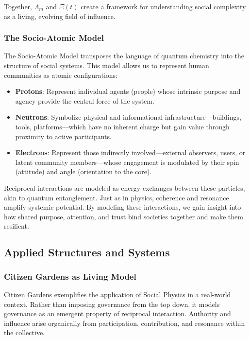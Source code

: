 \documentclass{article}
\theoremstyle{plain}
\theoremstyle{claimstyle}
\begin{document}
Together, $\Lambda_m$ and $\Xi(t)$ create a framework for understanding social complexity as a living, evolving field of influence.

\subsubsection{The Socio-Atomic Model}

The Socio-Atomic Model transposes the language of quantum chemistry into the structure of social systems. This model allows us to represent human communities as atomic configurations:

\begin{itemize}
    \item \textbf{Protons}: Represent individual agents (people) whose intrinsic purpose and agency provide the central force of the system.
    \item \textbf{Neutrons}: Symbolize physical and informational infrastructure—buildings, tools, platforms—which have no inherent charge but gain value through proximity to active participants.
    \item \textbf{Electrons}: Represent those indirectly involved—external observers, users, or latent community members—whose engagement is modulated by their spin (attitude) and angle (orientation to the core).
\end{itemize}

Reciprocal interactions are modeled as energy exchanges between these particles, akin to quantum entanglement. Just as in physics, coherence and resonance amplify systemic potential. By modeling these interactions, we gain insight into how shared purpose, attention, and trust bind societies together and make them resilient.

\subsection{Applied Structures and Systems}

\subsubsection{Citizen Gardens as Living Model}

Citizen Gardens exemplifies the application of Social Physics in a real-world context. Rather than imposing governance from the top down, it models governance as an emergent property of reciprocal interaction. Authority and influence arise organically from participation, contribution, and resonance within the collective.
\end{document}
